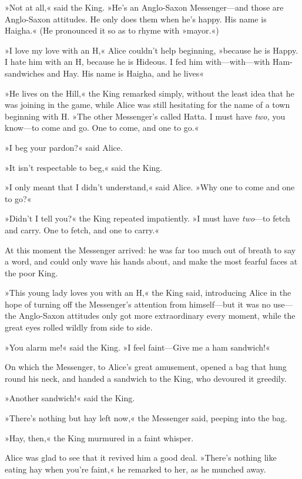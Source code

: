 »Not at all,« said the King. »He's an Anglo-Saxon Messenger—and those are Anglo-Saxon attitudes. He only does them when he's happy. His name is Haigha.« (He pronounced it so as to rhyme with »mayor.«)

»I love my love with an H,« Alice couldn't help beginning, »because he is Happy. I hate him with an H, because he is Hideous. I fed him with—with—with Ham-sandwiches and Hay. His name is Haigha, and he lives\longdash«

»He lives on the Hill,« the King remarked simply, without the least idea that he was joining in the game, while Alice was still hesitating for the name of a town beginning with H. »The other Messenger's called Hatta. I must have \textit{two,} you know—to come and go. One to come, and one to go.«

»I beg your pardon?« said Alice.

»It isn't respectable to beg,« said the King.

»I only meant that I didn't understand,« said Alice. »Why one to come and one to go?«

»Didn't I tell you?« the King repeated impatiently. »I must have \textit{two}—to fetch and carry. One to fetch, and one to carry.«

At this moment the Messenger arrived: he was far too much out of breath to say a word, and could only wave his hands about, and make the most fearful faces at the poor King.

»This young lady loves you with an H,« the King said, introducing Alice in the hope of turning off the Messenger's attention from himself—but it was no use—the Anglo-Saxon attitudes only got more extraordinary every moment, while the great eyes rolled wildly from side to side.

»You alarm me!« said the King. »I feel faint—Give me a ham sandwich!«

On which the Messenger, to Alice's great amusement, opened a bag that hung round his neck, and handed a sandwich to the King, who devoured it greedily.

»Another sandwich!« said the King.

»There's nothing but hay left now,« the Messenger said, peeping into the bag.

»Hay, then,« the King murmured in a faint whisper.

Alice was glad to see that it revived him a good deal. »There's nothing like eating hay when you're faint,« he remarked to her, as he munched away.

